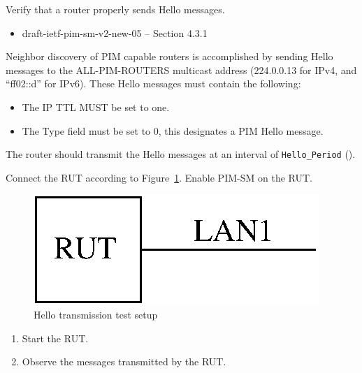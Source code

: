 \documentclass[11pt]{report}
\begin{document}
Verify that a router properly sends Hello messages.

\begin{itemize}
  \item draft-ietf-pim-sm-v2-new-05 -- Section 4.3.1
\end{itemize}

Neighbor discovery of PIM capable routers is accomplished by sending Hello
messages to the ALL-PIM-ROUTERS multicast address (224.0.0.13 for IPv4,
and ``ff02::d'' for IPv6). These Hello messages must contain the following:
\begin{itemize}

  \item The IP TTL MUST be set to one.

  \item The Type field must be set to 0, this designates a PIM Hello message.

\end{itemize}

The router should transmit the Hello messages at an interval of
\verb=Hello_Period= ({\PimsmHelloPeriod}).

Connect the RUT according to Figure~\ref{fig:pim_test_2_1_hello_transmission}.
Enable PIM-SM on the RUT.

\begin{figure}[htbp]
  \begin{center}
    \includegraphics[scale=0.8]{figs/pim_test_2_1_hello_transmission}
    \caption{Hello transmission test setup}
    \label{fig:pim_test_2_1_hello_transmission}
  \end{center}
\end{figure}

\begin{enumerate}

  \item Start the RUT.

  \item Observe the messages transmitted by the RUT.

\end{enumerate}
\end{document}
